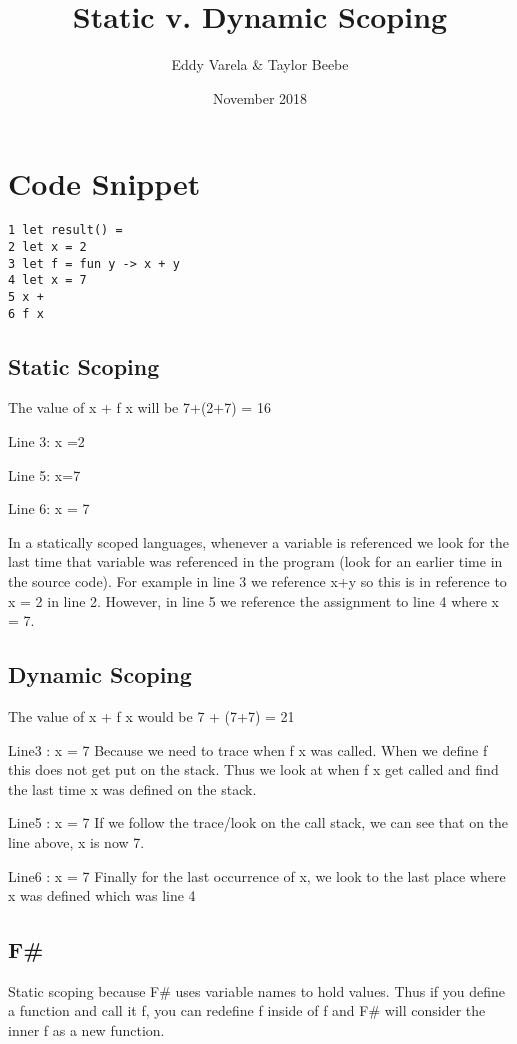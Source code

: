\documentclass{article}
\title{Static v. Dynamic Scoping}
\author{Eddy Varela & Taylor Beebe}
\date{November 2018}
\begin{document}
\maketitle
\section{Code Snippet}
\begin{verbatim}
1 let result() =
2 let x = 2
3 let f = fun y -> x + y
4 let x = 7
5 x +
6 f x
\end{verbatim}

\subsection{Static Scoping}
The value of x + f x will be 7+(2+7) = 16\newline{}

Line 3: x =2

Line 5: x=7

Line 6: x = 7\newline{}

 In a statically scoped languages, whenever a variable is referenced we look for the last time that variable was referenced in the program (look for an earlier time in the source code). For example in line 3 we reference x+y so this is in reference to x = 2 in line 2. However, in line 5 we reference the assignment to line 4 where x = 7.


\subsection{Dynamic Scoping}
The value of x + f x would be 7 + (7+7) = 21\newline{}

Line3 : x = 7 Because we need to trace when f x was called. When we define f this does not get put on the stack. Thus we look at when f x get called and find the last time x was defined on the stack.\newline{}

Line5 : x = 7
If we follow the trace/look on the call stack, we can see that on the line above, x is now 7. \newline{}

Line6 : x = 7
Finally for the last occurrence of x, we look to the last place where x was defined which was line 4

\subsection{F\#}
Static scoping because F\# uses variable names to hold values. Thus if you define a function and call it f, you can redefine f inside of f and F\# will consider the inner f as a new function.
\end{document}
